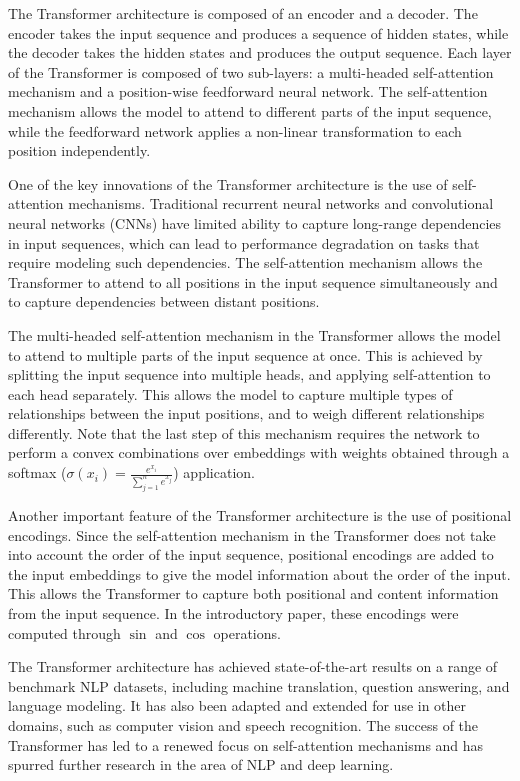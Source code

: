 \documentclass{article}
\begin{document}
The Transformer architecture is composed of an encoder and a decoder. The encoder takes the input sequence and produces a sequence of hidden states, while the decoder takes the hidden states and produces the output sequence. Each layer of the Transformer is composed of two sub-layers: a multi-headed self-attention mechanism and a position-wise feedforward neural network. The self-attention mechanism allows the model to attend to different parts of the input sequence, while the feedforward network applies a non-linear transformation to each position independently.

One of the key innovations of the Transformer architecture is the use of self-attention mechanisms. Traditional recurrent neural networks and convolutional neural networks (CNNs) have limited ability to capture long-range dependencies in input sequences, which can lead to performance degradation on tasks that require modeling such dependencies. The self-attention mechanism allows the Transformer to attend to all positions in the input sequence simultaneously and to capture dependencies between distant positions.

The multi-headed self-attention mechanism in the Transformer allows the model to attend to multiple parts of the input sequence at once. This is achieved by splitting the input sequence into multiple heads, and applying self-attention to each head separately. This allows the model to capture multiple types of relationships between the input positions, and to weigh different relationships differently. Note that the last step of this mechanism requires the network to perform a convex combinations over embeddings with weights obtained through a softmax ($\sigma(x_i) = \frac{e^{x_i}}{\sum_{j=1}^{n} e^{x_j}}$) application.

Another important feature of the Transformer architecture is the use of positional encodings. Since the self-attention mechanism in the Transformer does not take into account the order of the input sequence, positional encodings are added to the input embeddings to give the model information about the order of the input. This allows the Transformer to capture both positional and content information from the input sequence. In the introductory paper, these encodings were computed through $\sin$ and $\cos$ operations.

The Transformer architecture has achieved state-of-the-art results on a range of benchmark NLP datasets, including machine translation, question answering, and language modeling. It has also been adapted and extended for use in other domains, such as computer vision and speech recognition. The success of the Transformer has led to a renewed focus on self-attention mechanisms and has spurred further research in the area of NLP and deep learning.
\end{document}

